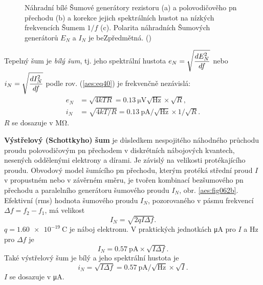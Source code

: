         \begin{figure}[ht!]  %
          \centering
                   \newline                                           
                   \newline    
          \caption{ Náhradní bílé Šumové generátory rezistoru (a) a polovodičověho pn přechodu (b)
                    a korekce jejich spektrálních hustot na nízkých frekvencích Šumem \(1/f\) (c).
                    Polarita náhradních Šumových generátorů \(E_N\) a \(I_N\) je beZpředmětná.
                    (\cite[s.~49]{Dostal})}
          \label{aes:fig062}
        \end{figure}

        Tepelný šum je \emph{bílý šum}, tj. jeho spektrální hustota \(e_N =
        \sqrt{\dfrac{d E_N^2}{d f}}\) nebo \(i_N = \sqrt{\dfrac{d I_N^2}{d f}}\) podle rov. (\ref{aes:eq40})
        je frekvenčně nezávislá:
        \begin{equation}\label{aes:eq074} 
          \begin{split}
            e_N &= \sqrt{4kTR}  = \SI{0.13}{\uV}\sqrt{\si{\Hz}}\times\sqrt{R},                 \\
            i_N &= \sqrt{4kT/R} = \SI{0.13}{\pA}/\sqrt{\si{\Hz}}\times1/\sqrt{R}.
          \end{split}
        \end{equation}
        \(R\) se dosazuje v \si{\mega\ohm}.

        \textbf{Výstřelový (Schottkyho) šum} je důsledkem nespojitého náhodného průchodu proudu
        polovodičovým pn přechodem v diskrétních nábojových kvantech, nesených oddělenými elektrony
        a dírami. Je závislý na velikosti protékajícího proudu. Obvodový model šumícího pn přechodu,
        kterým protéká střední proud \(I\) v propustném nebo v závěrném směru, je tvořen kombinací
        bezšumového pn přechodu a paralelního generátoru šumového proudu \(I_N\), obr.
        \ref{aes:fig062b}. Efektivní (rms) hodnota šumového proudu \(I_N\), pozorovaného v pásmu
        frekvencí \(\Delta f = f_2 - f_1\), má velikost
        \begin{equation}\label{aes:eq075}
          I_N = \sqrt{2qI\Delta f}.
        \end{equation}
        \(q = \SI{1.60e-19}{\coulomb}\) je náboj elektronu. V praktických jednotkách \si{\uA} pro
        \(I\) a \si{\Hz} pro \(\Delta f\) je
        \begin{equation}\label{aes:eq076}
          I_N = \SI{0.57}{\pA}\times\sqrt{I\Delta f}.
        \end{equation}
        Také výstřelový šum je bílý a jeho spektrální hustota je 
        \begin{equation}\label{aes:eq077}
          i_N = \sqrt{I\Delta f} = \SI{0.57}{\pA}/\sqrt{\si{\Hz}}\times\sqrt{I}.
        \end{equation}
        \(I\) se dosazuje v \si{\uA}.

